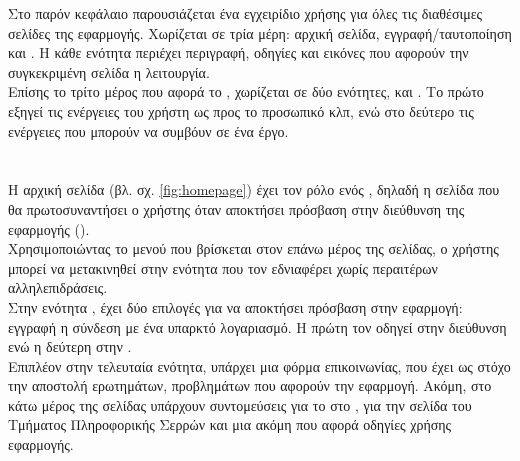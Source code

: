 \pSpace Στο παρόν κεφάλαιο παρουσιάζεται ένα εγχειρίδιο χρήσης για όλες τις διαθέσιμες σελίδες της εφαρμογής. Χωρίζεται σε τρία μέρη: αρχική σελίδα, εγγραφή/ταυτοποίηση και . Η κάθε ενότητα περιέχει περιγραφή, οδηγίες και εικόνες που αφορούν την συγκεκριμένη σελίδα η λειτουργία.\\
\pSpace Επίσης το τρίτο μέρος που αφορά το , χωρίζεται σε δύο ενότητες,  και . Το πρώτο εξηγεί τις ενέργειες του χρήστη ως προς το προσωπικό  κλπ, ενώ στο δεύτερο τις ενέργειες που μπορούν να συμβόυν σε ένα έργο.\\
\section{}
\pSpace Η αρχική σελίδα (βλ. σχ. \ref{fig:homepage}) έχει τον ρόλο ενός , δηλαδή η σελίδα που θα πρωτοσυναντήσει ο χρήστης όταν αποκτήσει πρόσβαση στην διεύθυνση της εφαρμογής ().\\
\pSpace Χρησιμοποιώντας το μενού που βρίσκεται στον επάνω μέρος της σελίδας, ο χρήστης μπορεί να μετακινηθεί στην ενότητα που τον εδνιαφέρει χωρίς περαιτέρων αλληλεπιδράσεις.\\
\pSpace Στην ενότητα , έχει δύο επιλογές για να αποκτήσει πρόσβαση στην εφαρμογή: εγγραφή η σύνδεση με ένα υπαρκτό λογαριασμό. Η πρώτη τον οδηγεί στην διεύθυνση  ενώ η δεύτερη στην .\\
\pSpace Επιπλέον στην τελευταία ενότητα, υπάρχει μια φόρμα επικοινωνίας, που έχει ως στόχο την αποστολή ερωτημάτων, προβλημάτων που αφορούν την εφαρμογή. Ακόμη, στο κάτω μέρος της σελίδας υπάρχουν συντομεύσεις για το  στο , για την σελίδα του Τμήματος Πληροφορικής Σερρών και μια ακόμη που αφορά οδηγίες χρήσης εφαρμογής.\\
\pagebreak

